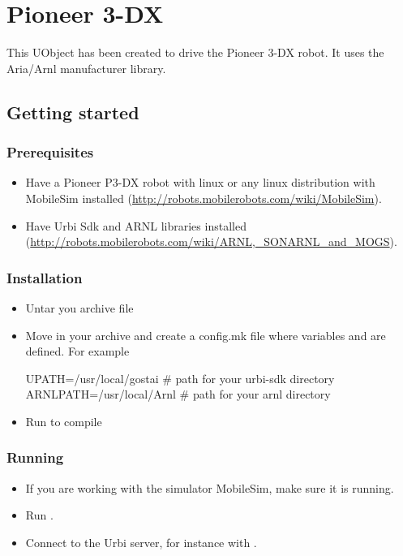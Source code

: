 
\chapter{Pioneer 3-DX}
\label{sec:p3dx}

This UObject has been created to drive the Pioneer 3-DX robot. It uses the
Aria/Arnl manufacturer library.

\section{Getting started}

\subsection{Prerequisites}
\begin{itemize}
\item Have a Pioneer P3-DX robot with linux or any linux distribution with
  MobileSim installed (\url{http://robots.mobilerobots.com/wiki/MobileSim}).

\item Have Urbi Sdk and ARNL libraries installed
  (\url{http://robots.mobilerobots.com/wiki/ARNL,_SONARNL_and_MOGS}).
\end{itemize}

\subsection{Installation}
\begin{itemize}
\item Untar you archive file
\item Move in your archive and create a config.mk file where variables
   and  are defined. For example
\begin{shell}
UPATH=/usr/local/gostai	 # path for your urbi-sdk directory
ARNLPATH=/usr/local/Arnl # path for your arnl directory
\end{shell}
\item Run  to compile
\end{itemize}

\subsection{Running}
\begin{itemize}
\item If you are working with the simulator MobileSim, make sure it is
  running.
\item Run .
\item Connect to the Urbi server, for instance with .
\end{itemize}


